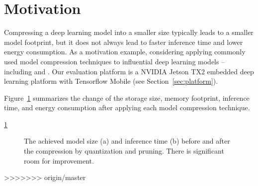
\section{Motivation}
Compressing a deep learning model into a smaller size typically leads to a smaller model footprint, but it does not always lead to faster
inference time and lower energy consumption. As a motivation example, considering applying  commonly used model compression
techniques to  influential deep learning models -- including  \CNNs and . Our evaluation platform is a
NVIDIA Jetson TX2 embedded deep learning platform with Tensorflow Mobile  (see Section~\ref{sec:platform}).

Figure~\ref{} summarizes the change of the storage size, memory footprint, inference time, and energy consumption after applying each model
compression technique.

\ref{fig:motivation}

\begin{figure}[!t]
\centering
{}
\hfill
{}
\caption{The achieved model size (a) and inference time (b) before and after the compression by quantization and pruning.
There is significant room for improvement.}
\label{fig:motivation}
\end{figure}
>>>>>>> origin/master
